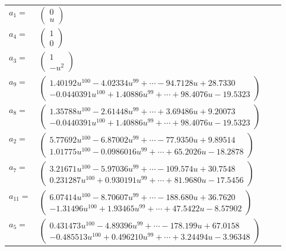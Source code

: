 \documentclass[1p]{elsarticle_modified}
\theoremstyle{definition}
\begin{document}
\begin{tabular}{m{7pt} m{180pt} m{7pt} m{180pt} }
\flushright $a_{1}=$&$\begin{pmatrix}0\\u\end{pmatrix}$ \\
\flushright $a_{4}=$&$\begin{pmatrix}1\\0\end{pmatrix}$ \\
\flushright $a_{3}=$&$\begin{pmatrix}1\\- u^2\end{pmatrix}$ \\
\flushright $a_{9}=$&$\begin{pmatrix}1.40192 u^{100}-4.02334 u^{99}+\cdots-94.7128 u+28.7330\\-0.0440391 u^{100}+1.40886 u^{99}+\cdots+98.4076 u-19.5323\end{pmatrix}$ \\
\flushright $a_{8}=$&$\begin{pmatrix}1.35788 u^{100}-2.61448 u^{99}+\cdots+3.69486 u+9.20073\\-0.0440391 u^{100}+1.40886 u^{99}+\cdots+98.4076 u-19.5323\end{pmatrix}$ \\
\flushright $a_{2}=$&$\begin{pmatrix}5.77692 u^{100}-6.87002 u^{99}+\cdots-77.9350 u+9.89514\\1.01775 u^{100}-0.0986016 u^{99}+\cdots+65.2026 u-18.2878\end{pmatrix}$ \\
\flushright $a_{7}=$&$\begin{pmatrix}3.21671 u^{100}-5.97036 u^{99}+\cdots-109.574 u+30.7548\\0.231287 u^{100}+0.930191 u^{99}+\cdots+81.9680 u-17.5456\end{pmatrix}$ \\
\flushright $a_{11}=$&$\begin{pmatrix}6.07414 u^{100}-8.70607 u^{99}+\cdots-188.680 u+36.7620\\-1.31496 u^{100}+1.93465 u^{99}+\cdots+47.5422 u-8.57902\end{pmatrix}$ \\
\flushright $a_{5}=$&$\begin{pmatrix}0.431473 u^{100}-4.89396 u^{99}+\cdots-178.199 u+67.0158\\-0.485513 u^{100}+0.496210 u^{99}+\cdots+3.24494 u-3.96348\end{pmatrix}$ \\

\end{tabular}
\end{document}
